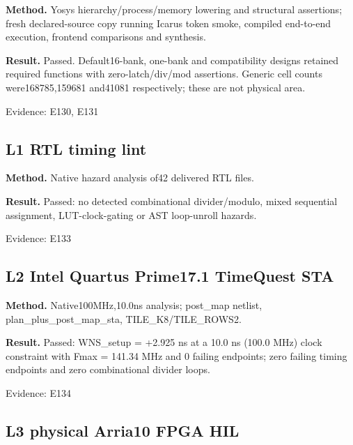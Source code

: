 \documentclass[11pt,a4paper]{article}
\begin{document}
\textbf{Method.} Yosys hierarchy/\allowbreak{}process/\allowbreak{}memory lowering and structural assertions; fresh declared-source copy running Icarus token smoke,\allowbreak{} compiled end-to-end execution,\allowbreak{} frontend comparisons and synthesis.

\textbf{Result.} Passed. Default16-bank,\allowbreak{} one-bank and compatibility designs retained required functions with zero-latch/\allowbreak{}div/\allowbreak{}mod assertions. Generic cell counts were168785,\allowbreak{}159681 and41081 respectively; these are not physical area.

{\small Evidence: E130,\allowbreak{} E131}

\subsection{L1 RTL timing lint}

\textbf{Method.} Native hazard analysis of42 delivered RTL files.

\textbf{Result.} Passed: no detected combinational divider/\allowbreak{}modulo,\allowbreak{} mixed sequential assignment,\allowbreak{} LUT-clock-gating or AST loop-unroll hazards.

{\small Evidence: E133}

\subsection{L2 Intel Quartus Prime17.1 TimeQuest STA}

\textbf{Method.} Native100MHz,\allowbreak{}10.0ns analysis; post\_\allowbreak{}map netlist,\allowbreak{} plan\_\allowbreak{}plus\_\allowbreak{}post\_\allowbreak{}map\_\allowbreak{}sta,\allowbreak{} TILE\_\allowbreak{}K8/\allowbreak{}TILE\_\allowbreak{}ROWS2.

\textbf{Result.} Passed: WNS\_\allowbreak{}setup =\allowbreak{} +\allowbreak{}2.925 ns at a 10.0 ns (\allowbreak{}100.0 MHz)\allowbreak{} clock constraint with Fmax =\allowbreak{} 141.34 MHz and 0 failing endpoints; zero failing timing endpoints and zero combinational divider loops.

{\small Evidence: E134}

\subsection{L3 physical Arria10 FPGA HIL}
\end{document}
